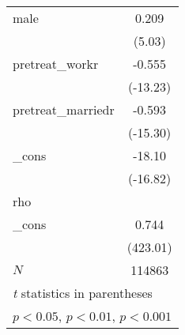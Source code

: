 {\begin{tabular}{l*{1}{c}}
male        &       0.209\sym{***}\\
            &      (5.03)         \\
[1em]
pretreat\_workr&      -0.555\sym{***}\\
            &    (-13.23)         \\
[1em]
pretreat\_marriedr&      -0.593\sym{***}\\
            &    (-15.30)         \\
[1em]
\_cons      &      -18.10\sym{***}\\
            &    (-16.82)         \\
\hline
rho         &                     \\
\_cons      &       0.744\sym{***}\\
            &    (423.01)         \\
\hline
\(N\)       &      114863         \\
\hline\hline
\multicolumn{2}{l}{\footnotesize \textit{t} statistics in parentheses}\\
\multicolumn{2}{l}{\footnotesize \sym{*} \(p<0.05\), \sym{**} \(p<0.01\), \sym{***} \(p<0.001\)}\\
\end{tabular}
}
